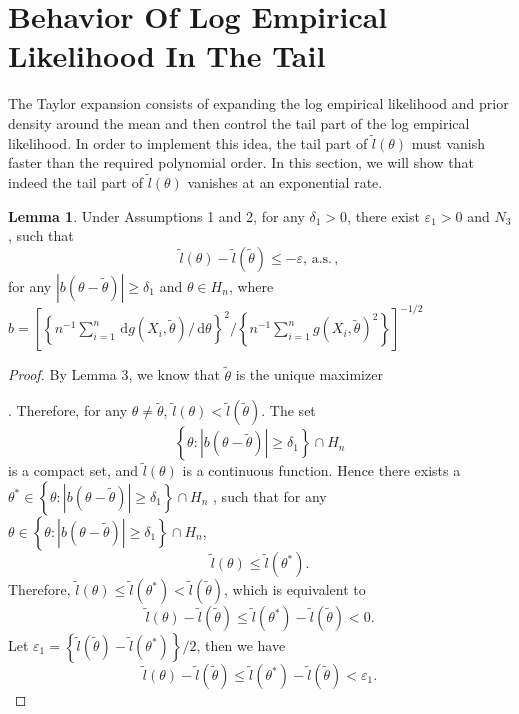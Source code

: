 \documentclass[oneside,english]{amsbook}
\numberwithin{section}{chapter}
\numberwithin{equation}{section}
\numberwithin{figure}{section}
\theoremstyle{plain}
\theoremstyle{plain}
\theoremstyle{definition}
\theoremstyle{plain}
\theoremstyle{plain}
\theoremstyle{remark}
\theoremstyle{definition}
\newtheorem{lemma}{Lemma}
\theoremstyle{definition}
\newcommand{\diff}{\,\mathrm{d}}
\newcommand{\ascv}{\,\mathrm{a.s.}\,}
\begin{document}
\section{Behavior Of Log Empirical Likelihood In  The Tail}

The Taylor expansion consists of  expanding the log empirical
likelihood and prior density around the mean and  then control
the tail part of the log empirical likelihood. In order to implement
this idea, the tail part of $\tilde{l}\left(\theta\right)$ must vanish
faster than the required polynomial order. In this section,
we will show that indeed the tail part of $\tilde{l}\left(\theta\right)$
vanishes at an exponential rate.
\begin{lemma}
\label{lemma:exponential-decay-tail} Under  Assumptions 1 and 2, for any $\delta_{1}>0$, there
exist $\varepsilon_{1}>0$ and $N_{3}$, such that 
\[
\tilde{l}\left(\theta\right)-\tilde{l}\left(\tilde{\theta}\right)\le-\varepsilon,\ascv,
\]
for any $\left|b\left(\theta-\tilde{\theta}\right)\right|\ge\delta_{1}$
and $\theta\in H_n$, where $b=\left[\left\{ n^{-1}\sum_{i=1}^{n}\diff g\left(X_{i},\tilde{\theta}\right)/\diff\theta\right\} ^{2}/\left\{ n^{-1}\sum_{i=1}^{n}g\left(X_{i},\tilde{\theta}\right)^{2}\right\} \right]^{-1/2}$\end{lemma}
\begin{proof}
By Lemma 3, we know that $\tilde{\theta}$ is the unique maximizer%

. Therefore, for any $\theta\neq\tilde{\theta}$, $\tilde{l}\left(\theta\right)<\tilde{l}\left(\tilde{\theta}\right)$.
The set 
\[
\left\{ \theta:\left|b\left(\theta-\tilde{\theta}\right)\right|\ge\delta_{1}\right\} \cap H_n
\]
is a compact set, and $\tilde{l}\left(\theta\right)$ is a continuous
function. Hence there exists a $\theta^{*}\in\left\{ \theta:\left|b\left(\theta-\tilde{\theta}\right)\right|\ge\delta_{1}\right\} \cap H_n$
, such that for any $\theta\in\left\{ \theta:\left|b\left(\theta-\tilde{\theta}\right)\right|\ge\delta_{1}\right\} \cap H_n$,
\[
\tilde{l}\left(\theta\right)\le\tilde{l}\left(\theta^{*}\right).
\]
Therefore, $\tilde{l}\left(\theta\right)\le\tilde{l}\left(\theta^{*}\right)<\tilde{l}\left(\tilde{\theta}\right)$, which is equivalent to 
\[
\tilde{l}\left(\theta\right)-\tilde{l}\left(\tilde{\theta}\right)\le\tilde{l}\left(\theta^{*}\right)-\tilde{l}\left(\tilde{\theta}\right)<0.
\]
Let $\varepsilon_{1}=\left\{ \tilde{l}\left(\tilde{\theta}\right)-\tilde{l}\left(\theta^{*}\right)\right\} /2$,
then we have 
\[
\tilde{l}\left(\theta\right)-\tilde{l}\left(\tilde{\theta}\right)\le\tilde{l}\left(\theta^{*}\right)-\tilde{l}\left(\tilde{\theta}\right)<\varepsilon_{1}.
\]

\end{proof}
\end{document}
